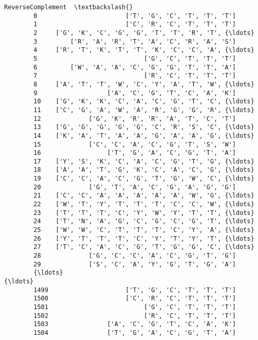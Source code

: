 \documentclass[11pt]{article}
\begin{document}
\begin{Verbatim}[commandchars=\\\{\}]
                                              ReverseComplement  \textbackslash{}
        0                        ['T', 'G', 'C', 'T', 'T', 'T']   
        1                        ['C', 'R', 'C', 'T', 'T', 'T']   
        2     ['G', 'K', 'C', 'G', 'G', 'T', 'T', 'R', 'T', {\ldots}   
        3         ['R', 'A', 'R', 'T', 'A', 'C', 'R', 'A', 'S']   
        4     ['R', 'T', 'K', 'T', 'T', 'K', 'C', 'C', 'A', {\ldots}   
        5                             ['G', 'C', 'T', 'T', 'T']   
        6         ['W', 'A', 'A', 'C', 'G', 'G', 'T', 'T', 'A']   
        7                             ['R', 'C', 'T', 'T', 'T']   
        8     ['A', 'T', 'T', 'W', 'C', 'Y', 'A', 'T', 'W', {\ldots}   
        9                   ['A', 'C', 'G', 'T', 'C', 'A', 'K']   
        10    ['G', 'K', 'K', 'C', 'A', 'C', 'G', 'T', 'C', {\ldots}   
        11    ['C', 'G', 'A', 'W', 'A', 'R', 'G', 'G', 'R', {\ldots}   
        12             ['G', 'K', 'R', 'R', 'A', 'T', 'C', 'T']   
        13    ['G', 'G', 'G', 'G', 'G', 'C', 'R', 'S', 'C', {\ldots}   
        14    ['K', 'A', 'T', 'A', 'A', 'G', 'A', 'A', 'G', {\ldots}   
        15             ['C', 'C', 'A', 'C', 'G', 'T', 'S', 'W']   
        16                  ['T', 'G', 'A', 'C', 'G', 'T', 'A']   
        17    ['Y', 'S', 'K', 'C', 'A', 'C', 'G', 'T', 'G', {\ldots}   
        18    ['A', 'A', 'T', 'G', 'K', 'C', 'A', 'C', 'G', {\ldots}   
        19    ['C', 'C', 'A', 'C', 'G', 'T', 'G', 'W', 'C', {\ldots}   
        20             ['G', 'T', 'A', 'C', 'G', 'A', 'G', 'G']   
        21    ['C', 'C', 'A', 'A', 'A', 'A', 'A', 'W', 'G', {\ldots}   
        22    ['W', 'T', 'Y', 'T', 'T', 'T', 'C', 'C', 'W', {\ldots}   
        23    ['T', 'T', 'T', 'C', 'Y', 'W', 'Y', 'T', 'T', {\ldots}   
        24    ['T', 'N', 'A', 'G', 'C', 'G', 'C', 'G', 'T', {\ldots}   
        25    ['W', 'W', 'C', 'T', 'T', 'T', 'C', 'Y', 'A', {\ldots}   
        26    ['Y', 'T', 'T', 'T', 'C', 'Y', 'T', 'Y', 'T', {\ldots}   
        27    ['T', 'C', 'A', 'C', 'G', 'T', 'G', 'G', 'C', {\ldots}   
        28             ['G', 'C', 'C', 'A', 'C', 'G', 'T', 'G']   
        29             ['S', 'C', 'A', 'Y', 'G', 'T', 'G', 'A']   
        {\ldots}                                                 {\ldots}   
        1499                     ['T', 'G', 'C', 'T', 'T', 'T']   
        1500                     ['C', 'R', 'C', 'T', 'T', 'T']   
        1501                          ['G', 'C', 'T', 'T', 'T']   
        1502                          ['R', 'C', 'T', 'T', 'T']   
        1503                ['A', 'C', 'G', 'T', 'C', 'A', 'K']   
        1504                ['T', 'G', 'A', 'C', 'G', 'T', 'A']   

\end{Verbatim}
\end{document}
